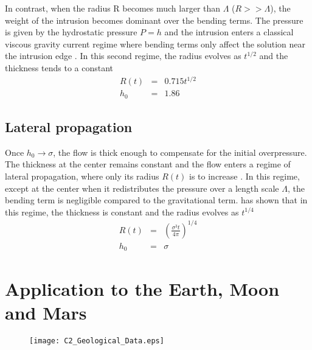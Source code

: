 In contrast, when the radius R becomes much larger than $\Lambda$
($R>>\Lambda$), the weight of the  intrusion becomes dominant over the
bending  terms.  The  pressure is  given by  the hydrostatic  pressure
$P = h$ and the intrusion enters a classical viscous gravity current regime
where bending terms  only affect the solution near  the intrusion edge
\citep{Huppert:1982a,Michaut:2011kg,Lister:2013ia}.   In  this  second
regime, the radius  evolves as $t^{1/2}$ and the thickness  tends to a
constant
\begin{eqnarray}
  R(t) &=& 0.715 t^{1/2}\label{Scaling-R-Gravi}\\
  h_0 &=& 1.86\label{Scaling-H-Gravi}
\end{eqnarray} 

\subsection{Lateral propagation}
\label{sec:lateral-propagation}

Once $h_0\rightarrow \sigma$,  the flow is thick  enough to compensate
for  the initial  overpressure. The  thickness at  the center  remains
constant and  the flow enters  a regime of lateral  propagation, where
only its radius $R(t)$ is  to increase \citep{Michaut:2011kg}. In this
regime, except at the center when it redistributes the pressure over a
length scale $\Lambda$, the bending term is negligible compared to the
gravitational  term. \citet{Michaut:2011kg}  has  shown  that in  this
regime, the thickness is constant and the radius evolves as $t^{1/4}$
\begin{eqnarray}
  R(t) &=& \left(\frac{\sigma^3 t}{4\pi}\right)^{1/4}\label{Scaling-R-Propa}\\
  h_0 &=& \sigma\label{Scaling-H-Propa}
\end{eqnarray} 

\section{Application to the Earth, Moon and Mars}
\label{C2-sec:appl-earth-moon}

  \begin{figure}
    \begin{center}
    \graphicspath{ {/Users/thorey/Documents/These/Manuscript/Figure/Chapter2/} }
      \texttt{[image: C2\_Geological\_Data.eps]}
      \caption{}
      \label{C2_Geological_Data}
    \end{center}
  \end{figure}


